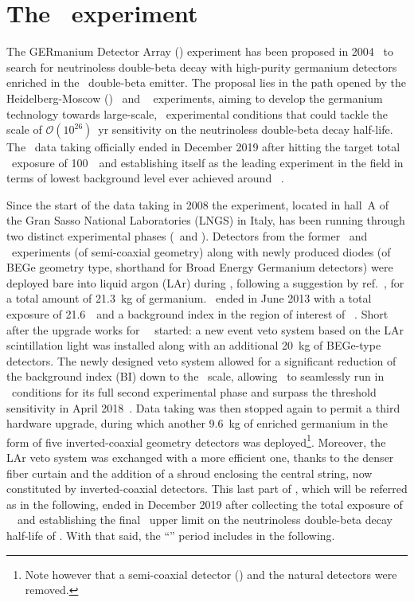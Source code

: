 \chapter{The \gerda\ experiment}\label{chap:gerda}

The GERmanium Detector Array (\gerda) experiment has been proposed in
2004~\cite{gerda-proposal} to search for neutrinoless double-beta decay with high-purity
germanium detectors enriched in the \gesix\ double-beta emitter. The proposal lies in the
path opened by the Heidelberg-Moscow (\hdm)~\cite{Klapdor2001} and
\igex~\cite{Aalseth2002} experiments, aiming to develop the germanium technology towards
large-scale, \bkgfree\ experimental conditions that could tackle the scale of
$\mathcal{O}(10^{26})$~yr sensitivity on the neutrinoless double-beta decay half-life. The
\gerda\ data taking officially ended in December 2019 after hitting the target total
\bkgfree\ exposure of 100~\kgyr\ and establishing itself as the leading experiment in the
field in terms of lowest background level ever achieved around \qbb~\cite{Agostini2019a}.

Since the start of the data taking in 2008 the experiment, located in hall~A of the Gran
Sasso National Laboratories (LNGS) in Italy, has been running through two distinct
experimental phases (\phaseone\ and \phasetwo). Detectors from the former \hdm\ and
\igex\ experiments (of semi-coaxial geometry) along with newly produced diodes (of BEGe
geometry type, shorthand for Broad Energy Germanium detectors) were deployed bare into
liquid argon (LAr) during \phaseone, following a suggestion by ref.~\cite{Heusser1995}, for a total amount
of 21.3~kg of germanium. \phaseone\ ended in June 2013 with a total exposure of
21.6~\kgyr\ and a background index in the region of interest of \pIbi~\cite{Agostini2016}.
Short after the upgrade works for \gerda\ \phasetwo\ started: a new event veto system
based on the LAr scintillation light was installed along with an additional 20~kg of
BEGe-type detectors.  The newly designed veto system allowed for a significant reduction
of the background index (BI) down to the \vctsper\ scale, allowing \gerda\ to seamlessly
run in \bkgfree\ conditions for its full second experimental phase and surpass the
 threshold sensitivity in April 2018~\cite{Agostini2019a}. Data taking was
then stopped again to permit a third hardware upgrade, during which another 9.6~kg of
enriched germanium in the form of five inverted-coaxial geometry detectors was
deployed\footnote{Note however that a semi-coaxial detector () and the natural
\GTF{} detectors were removed.}. Moreover, the LAr veto
system was exchanged with a more efficient one, thanks to the denser fiber curtain and the
addition of a shroud enclosing the central string, now constituted by inverted-coaxial
detectors. This last part of \phasetwo, which will be referred as \phasetwop in the
following, ended in December 2019 after collecting the total exposure of \fillme~\kgyr\
and establishing the final \gerda\ upper limit on the neutrinoless double-beta decay
half-life of \gerdafinallimit. With that said, the ``\phasetwo'' period includes
\phasetwop in the following.

